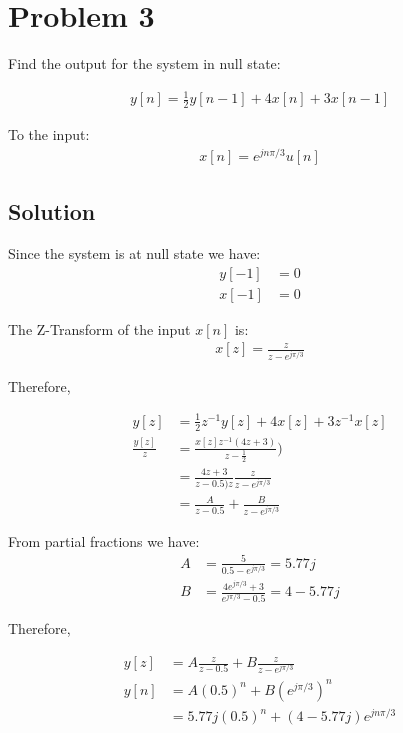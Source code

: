 \section*{Problem 3}

Find the output for the system in null state:

\begin{equation*}
\begin{aligned}
y[n] = \frac{1}{2} y[n-1] + 4x[n] + 3x[n-1]
\end{aligned}
\end{equation*} 

To the input:
\begin{equation*}
\begin{aligned}
x[n]=e^{j n \pi/3} u[n]
\end{aligned}
\end{equation*} 

\subsection*{Solution}
Since the system is at null state we have:
\begin{equation*}
\begin{aligned}
y[-1] &= 0\\
x[-1] &= 0
\end{aligned}
\end{equation*} 

The Z-Transform of the input $x[n]$ is:
\begin{equation*}
\begin{aligned}
x[z] = \frac{z}{z-e^{j\pi/3}}
\end{aligned}
\end{equation*} 

Therefore,

\begin{equation*}
\begin{aligned}
y[z] &= \frac{1}{2} z^{-1}y[z] + 4x[z] + 3z^{-1}x[z] \\
\frac{y[z]}{z} &= \frac{x[z]z^{-1}(4z+3)}{z-\frac{1}{2}}) \\
&= \frac{4z+3}{z-0.5)z} \frac{z}{z-e^{j\pi/3}}\\
&= \frac{A}{z-0.5} + \frac{B}{z-e^{j\pi/3}}
\end{aligned}
\end{equation*} 

From partial fractions we have:
\begin{equation*}
\begin{aligned}
A &= \frac{5}{0.5-e^{j\pi/3}} = 5.77j \\
B &= \frac{4e^{j\pi/3}+3}{e^{j\pi/3}-0.5} = 4-5.77j
\end{aligned}
\end{equation*}

Therefore,

\begin{equation*}
\begin{aligned}
y[z] &= A \frac{z}{z-0.5} + B \frac{z}{z-e^{j\pi/3}} \\
y[n] &= A (0.5)^n + B (e^{j\pi/3})^n\\
&= 5.77j (0.5)^n + (4-5.77j)e^{jn\pi/3}
\end{aligned}
\end{equation*} 
